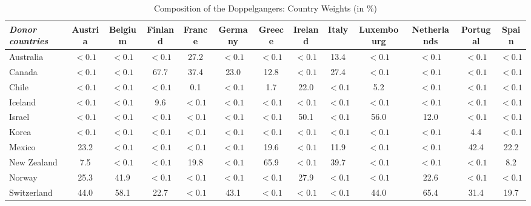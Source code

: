 \documentclass[12pt]{article}
\begin{document}
\begin{appendices}
\begin{landscape}
\begin{table}[htbp]
\scriptsize
\caption{\label{TA_weights_placebo}  Composition of the Doppelgangers: Country Weights (in \%)}\centering\medskip
\begin{tabular}{lcccccccccccc} \toprule
\textit{Donor countries} & Austria  & Belgium  & Finland  & France  & Germany  & Greece  & Ireland  & Italy  & Luxembourg  & Netherlands  & Portugal  & Spain  \\  \midrule
Australia &      $<0.1$ &       $<0.1$ &     $<0.1$ &       27.2 &       $<0.1$ &       $<0.1$ &       $<0.1$ &       13.4 &       $<0.1$ &       $<0.1$ &       $<0.1$ &       $<0.1$ \\  
Canada &       $<0.1$ &       $<0.1$ &      67.7 &     37.4 &      23.0 &       12.8 &       $<0.1$ &      27.4 &       $<0.1$ &       $<0.1$ &       $<0.1$ &       $<0.1$ \\  
Chile &       $<0.1$ &       $<0.1$ &       $<0.1$ &       0.1 &       $<0.1$ &      1.7 &      22.0 &       $<0.1$ &       5.2 &       $<0.1$ &       $<0.1$ &       $<0.1$ \\  
Iceland &       $<0.1$ &       $<0.1$ &      9.6 &       $<0.1$ &       $<0.1$ &       $<0.1$ &       $<0.1$ &       $<0.1$ &       $<0.1$ &       $<0.1$ &       $<0.1$ &       $<0.1$ \\  
Israel &     $<0.1$ &      $<0.1$ &       $<0.1$ &       $<0.1$ &       $<0.1$ &       $<0.1$ &      50.1 &       $<0.1$ &      56.0 &      12.0 &      $<0.1$ &       $<0.1$ \\  
Korea &       $<0.1$ &       $<0.1$ &       $<0.1$ &       $<0.1$ &       $<0.1$ &       $<0.1$ &       $<0.1$ &       $<0.1$ &       $<0.1$ &       $<0.1$ &       4.4 &       $<0.1$ \\  
Mexico &       23.2 &       $<0.1$ &       $<0.1$ &       $<0.1$ &       $<0.1$ &       19.6 &       $<0.1$ &      11.9 &       $<0.1$ &       $<0.1$ &      42.4 &      22.2 \\  
New Zealand &      7.5 &       $<0.1$ &       $<0.1$ &      19.8 &      $<0.1$ &    65.9 &       $<0.1$ &       39.7 &       $<0.1$ &       $<0.1$ &       $<0.1$ &       8.2 \\  
Norway &      25.3 &       41.9 &       $<0.1$ &      $<0.1$ &       $<0.1$ &       $<0.1$ &      27.9 &       $<0.1$ &       $<0.1$ &      22.6 &       $<0.1$ &       $<0.1$ \\  
Switzerland &      44.0 &      58.1 &      22.7 &       $<0.1$ &      43.1 &      $<0.1$ &       $<0.1$ &      $<0.1$ &      44.0 &      65.4 &     31.4 &      19.7 \\  

\end{tabular}
\end{table}
\end{landscape}
\end{appendices}
\end{document}
